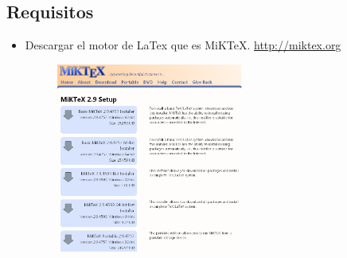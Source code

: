   \subsection{ Requisitos}
      \begin{itemize}
          \item Descargar el motor de LaTex que es MiKTeX.
              \url{  http://miktex.org }
            \begin{figure}[htb]
              \centering
                \includegraphics[width=0.58\textwidth]{./imagenes2/image.png}
             \end{figure}


\end{itemize}
